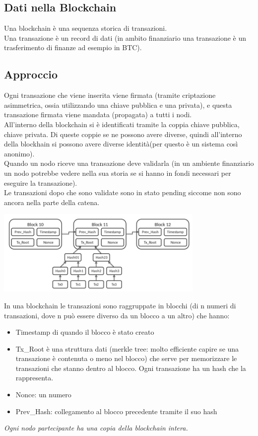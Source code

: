 \subsection{Dati nella Blockchain}
Una blockchain è una sequenza storica di transazioni.\\
Una transazione è un record di dati (in ambito finanziario una transazione è un trasferimento di finanze ad esempio in BTC).


\subsection{Approccio}
Ogni transazione che viene inserita viene firmata (tramite criptazione asimmetrica, ossia utilizzando una chiave pubblica e una privata), e questa transazione firmata viene mandata (propagata) a tutti i nodi. \\
All'interno della blockchain si è identificati tramite la coppia chiave pubblica, chiave privata. Di queste coppie se ne possono avere diverse, quindi all'interno della blockhain si possono avere diverse identità(per questo è un sistema così anonimo).\\
Quando un nodo riceve una transazione deve validarla (in un ambiente finanziario un nodo potrebbe vedere nella sua storia se si hanno in fondi necessari per eseguire la transazione).\\
Le transazioni dopo che sono validate sono in stato pending siccome non sono ancora nella parte della catena.\\
\begin{center}
    \includegraphics[width = .7\textwidth]{images/lezione6/approccio.png}
\end{center}
In una blockchain le transazioni sono raggruppate in blocchi (di n numeri di transazioni, dove n può essere diverso da un blocco a un altro) che hanno:
\begin{itemize}
    \item Timestamp di quando il blocco è stato creato
    \item Tx\_Root è una struttura dati (merkle tree: molto efficiente capire se una transazione è contenuta o meno nel blocco) che serve per memorizzare le transazioni che stanno dentro al blocco. Ogni transazione ha un hash che la rappresenta. 
    \item Nonce: un numero
    \item Prev\_Hash: collegamento al blocco precedente tramite il suo hash
\end{itemize}
\textit{Ogni nodo partecipante ha una copia della blockchain intera.}

